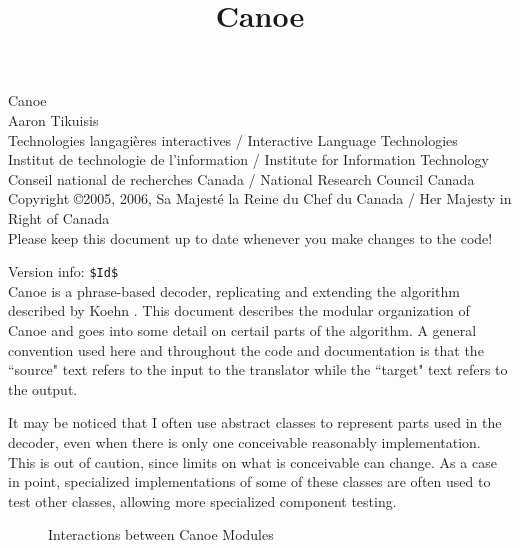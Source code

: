 \documentclass[12pt]{amsart} \usepackage{epsfig} \usepackage{rotating}
\begin{document}
\title{Canoe} \maketitle

{\tiny
\noindent
   Canoe\\ 
   Aaron Tikuisis\\ 
   Technologies langagi{\`e}res interactives /
      Interactive Language Technologies\\
   Institut de technologie de l'information /
      Institute for Information Technology\\
   Conseil national de recherches Canada / National Research Council Canada\\ 
   Copyright \copyright 2005, 2006, Sa Majest{\'e} la Reine du Chef du Canada /
      Her Majesty in Right of Canada }
\\

\noindent
Please keep this document up to date whenever you make changes to the code!

{\tiny
\noindent
Version info: \verb+$Id$+
}
\\

Canoe is a phrase-based decoder, replicating and extending the
algorithm described by Koehn \cite{koehn03}.  This document
describes the modular organization of Canoe and goes into some detail on
certail parts of the algorithm.  A general convention used here and throughout
the code and documentation is that the ``source" text refers to the input to
the translator while the ``target" text refers to the output.

It may be noticed that I often use abstract classes to represent parts used in
the decoder, even when there is only one conceivable reasonably implementation.
This is out of caution, since limits on what is conceivable can change.  As a
case in point, specialized implementations of some of these classes are often
used to test other classes, allowing more specialized component testing.

\begin{sidewaysfigure}
\centerline{}
\caption{Interactions between Canoe Modules\label{fig:uml}}
\end{sidewaysfigure}
\end{document}
